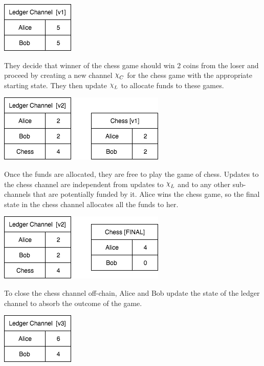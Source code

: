\documentclass{article}
\DeclareRobustCommand{\rchi}{{\mathpalette\irchi\relax}}
\newcommand{\irchi}[2]{\raisebox{\depth}{$#1\chi$}} %
\theoremstyle{definition}
\begin{document}
\begin{center}
  \includegraphics[scale=0.5]{turbo_start} %
\end{center}

They decide that winner of the chess game should win 2 coins from the loser and proceed
by creating a new channel $\rchi_C$ for the chess game with the appropriate starting state.
They then update $\rchi_L$ to allocate funds to these games.

\begin{center}
  \includegraphics[scale=0.5]{turbo_open} %
\end{center}

Once the funds are allocated, they are free to play the game of chess.
Updates to the chess channel are independent from updates to $\rchi_L$ and to
any other sub-channels that are potentially funded by it. 
Alice wins the chess game, so the final state in the chess channel allocates all the
funds to her.

\begin{center}
  \includegraphics[scale=0.5]{turbo_close} %
\end{center}

To close the chess channel off-chain, Alice and Bob update the state of the ledger channel to absorb the outcome of the game.

\begin{center}
  \includegraphics[scale=0.5]{turbo_finish} %
\end{center}
\end{document}

